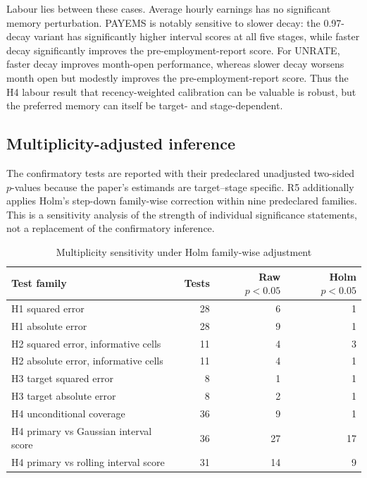 Labour lies between these cases. Average hourly earnings has no significant
memory perturbation. PAYEMS is notably sensitive to slower decay: the
0.97-decay variant has significantly higher interval scores at all five
stages, while faster decay significantly improves the pre-employment-report
score. For UNRATE, faster decay improves month-open performance, whereas
slower decay worsens month open but modestly improves the
pre-employment-report score. Thus the H4 labour result that recency-weighted calibration
can be valuable is robust, but the preferred memory can itself be
target- and stage-dependent.

\subsection{Multiplicity-adjusted inference}
\label{subsec:multiplicity}

The confirmatory tests are reported with their predeclared unadjusted
two-sided \(p\)-values because the paper's estimands are target--stage
specific. R5 additionally applies Holm's step-down family-wise correction
within nine predeclared families. This is a sensitivity analysis of the
strength of individual significance statements, not a replacement of the
confirmatory inference.

\begin{table}[H]
\centering
\caption{Multiplicity sensitivity under Holm family-wise adjustment}
\label{tab:holm_robustness}
\small
\begin{tabular}{lrrr}
\toprule
Test family & Tests & Raw \(p<0.05\) & Holm \(p<0.05\) \\
\midrule
H1 squared error & 28 & 6 & 1 \\
H1 absolute error & 28 & 9 & 1 \\
H2 squared error, informative cells & 11 & 4 & 3 \\
H2 absolute error, informative cells & 11 & 4 & 1 \\
H3 target squared error & 8 & 1 & 1 \\
H3 target absolute error & 8 & 2 & 1 \\
H4 unconditional coverage & 36 & 9 & 1 \\
H4 primary vs Gaussian interval score & 36 & 27 & 17 \\
H4 primary vs rolling interval score & 31 & 14 & 9 \\
\bottomrule
\end{tabular}
\end{table}

